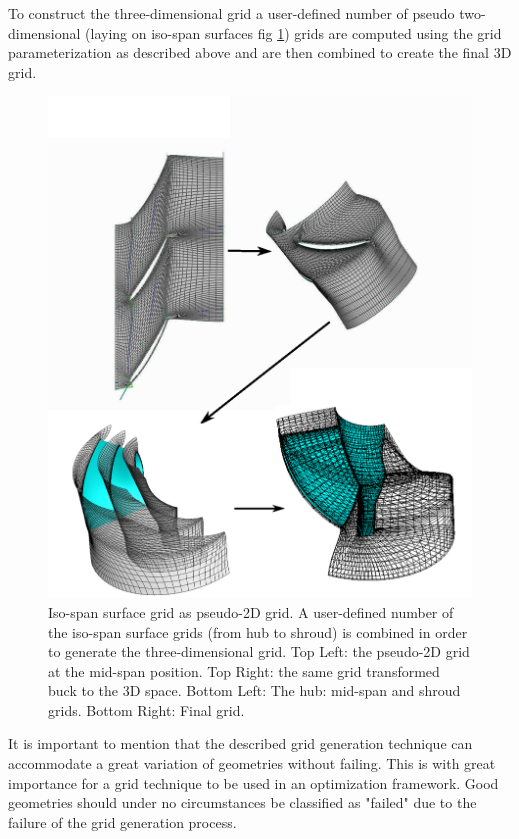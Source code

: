 To construct the three-dimensional grid a user-defined number of pseudo two-dimensional (laying on iso-span surfaces fig \ref{grid4}) grids are computed using the grid parameterization as described above and are then combined to create the final 3D grid.

\begin{figure}[h!]
\centering
\includegraphics[width=140mm]{merid.eps} 
\caption{Iso-span surface grid as pseudo-2D grid. A user-defined number of the iso-span surface grids (from hub to shroud) is combined in order to generate the three-dimensional grid. Top Left: the pseudo-2D grid at the mid-span position. Top Right: the same grid transformed buck to the 3D space. Bottom Left: The hub: mid-span and shroud grids. Bottom Right: Final grid.}
\label{grid4}
\end{figure}

It is important to mention that the described grid generation technique can accommodate a great variation of geometries without failing. This is with great importance for a grid technique to be used in an optimization framework. Good geometries should under no circumstances be classified as "failed" due to the failure of the grid generation process. 

